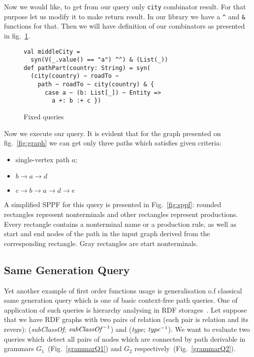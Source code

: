 Now we would like, to get from our query only \lstinline{city} combinator result. 
For that purpose let us modify it to make return result. 
In our library we have a \lstinline{^} and \lstinline{&} functions for that. 
Then we will have definition of our combinators as presented in fig.~\ref{fig:fixedPathQ}.

\begin{figure}[h]
\begin{lstlisting}
val middleCity = 
  syn(V(_.value() == "a") ^^) & (List(_))
def pathPart(country: String) = syn(
  (city(country) ~ roadTo ~ 
    path ~ roadTo ~ city(country) & {
      case a ~ (b: List[_]) ~ Entity => 
        a +: b :+ c })
\end{lstlisting}
\caption{Fixed queries}
\label{fig:fixedPathQ}
\end{figure}

Now we execute our query. It is evident that for the graph presented on fig.~\ref{fig:graph} we can get only three paths which satisfies given criteria:
\begin{itemize}
\item single-vertex path $a$;
\item $b \rightarrow a \rightarrow d$
\item $c \rightarrow b \rightarrow a \rightarrow d \rightarrow e$
\end{itemize}

A simplified SPPF for this query is presented in Fig.~\ref{fig:sppf}: rounded rectangles represent nonterminals and other rectangles represent productions. 
Every rectangle contains a nonterminal name or a production rule, as well as start and end nodes of the path in the input graph derived from the corresponding rectangle. 
Gray rectangles are start nonterminals.

\subsection{Same Generation Query}

Yet another example of first order functions usage is generalisation o.f classical same generation query which is one of basic context-free path queries.
One of application of such queries is hierarchy analysing in RDF storages~\cite{CFGonRDF}.
Let suppose that we have RDF graphs with two pairs of relation (each pair is relation and its revers): (\emph{subClassOf}; $\text{\emph{subClassOf}}^{-1}$) and (\emph{type}; $\text{\emph{type}}^{-1}$).
We want to evaluate two queries which detect all pairs of nodes which are connected by path derivable in grammars $G_1$~(Fig.~\ref{grammarQ1}) and $G_2$ respectively~(Fig.~\ref{grammarQ2}). 


